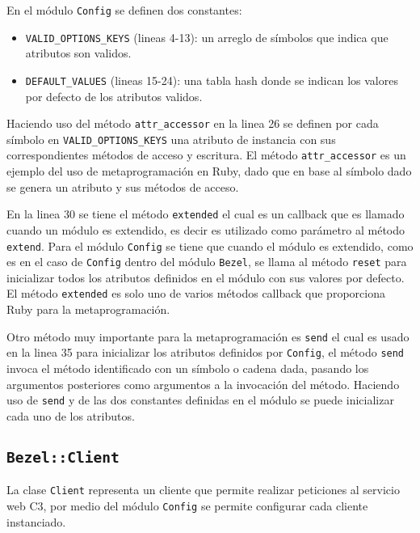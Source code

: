 En el módulo \texttt{Config} se definen dos constantes:

\begin{itemize}
\item \texttt{VALID\_OPTIONS\_KEYS} (lineas 4-13): un arreglo de símbolos que indica
  que atributos son validos.
\item \texttt{DEFAULT\_VALUES} (lineas 15-24): una tabla hash donde se indican los
  valores por defecto de los atributos validos.
\end{itemize}

Haciendo uso del método \texttt{attr\_accessor} en la linea 26 se definen por cada
símbolo en \texttt{VALID\_OPTIONS\_KEYS} una atributo de instancia con sus
correspondientes métodos de acceso y escritura. El método \texttt{attr\_accessor} es
un ejemplo del uso de metaprogramación en Ruby, dado que en base al símbolo dado se
genera un atributo y sus métodos de acceso.


En la linea 30 se tiene el método \texttt{extended} el cual es un callback que es
llamado cuando un módulo es extendido, es decir es utilizado como parámetro al
método \texttt{extend}. Para el módulo \texttt{Config} se tiene que cuando el módulo
es extendido, como es en el caso de \texttt{Config} dentro del módulo \texttt{Bezel},
se llama al método \texttt{reset} para inicializar todos los atributos definidos en
el módulo con sus valores por defecto. El método \texttt{extended} es solo uno
de varios métodos callback que proporciona Ruby para la metaprogramación.

Otro método muy importante para la metaprogramación es \texttt{send} el cual es usado
en la linea 35 para inicializar los atributos definidos por \texttt{Config}, el
método \texttt{send} invoca el método identificado con un símbolo o cadena dada,
pasando los argumentos posteriores como argumentos a la invocación del método.
Haciendo uso de \texttt{send} y de las dos constantes definidas en el módulo
se puede inicializar cada uno de los atributos.

\subsection{\texttt{Bezel::Client}}

La clase \texttt{Client} representa un cliente que permite realizar peticiones al 
servicio web C3, por medio del módulo \texttt{Config} se permite configurar
cada cliente instanciado.

